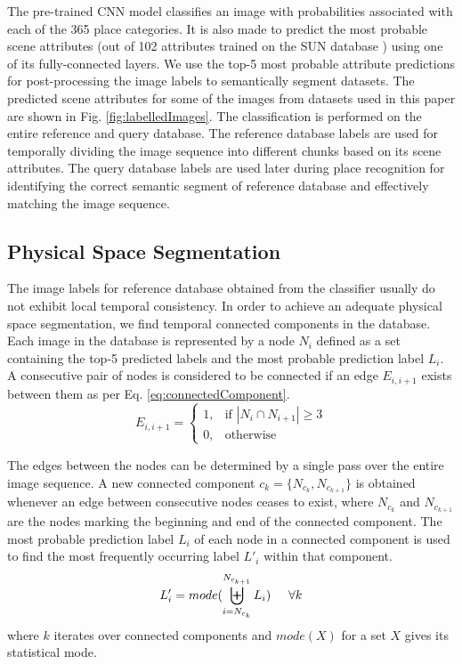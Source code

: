 \documentclass[letterpaper, 10 pt, conference]{ieeeconf}  %
\begin{document}
The pre-trained CNN model classifies an image with probabilities associated with each of the 365 place categories. It is also made to predict the most probable scene attributes (out of 102 attributes trained on the SUN database \cite{Patterson2012SunAttributes}) using one of its fully-connected layers. We use the top-5 most probable attribute predictions for post-processing the image labels to semantically segment datasets. The predicted scene attributes for some of the images from datasets used in this paper are shown in Fig. \ref{fig:labelledImages}. The classification is performed on the entire reference and query database. The reference database labels are used for temporally dividing the image sequence into different chunks based on its scene attributes. The query database labels are used later during place recognition for identifying the correct semantic segment of reference database and effectively matching the image sequence.

\subsection{Physical Space Segmentation}
The image labels for reference database obtained from the classifier usually do not exhibit local temporal consistency. In order to achieve an adequate physical space segmentation, we find temporal connected components in the database. Each image in the database is represented by a node $N_i$ defined as a set containing the top-5 predicted labels and the most probable prediction label $L_i$. A consecutive pair of nodes is considered to be connected if an edge $E_{i,i+1}$ exists between them as per Eq. \ref{eq:connectedComponent}.
\begin{equation}
 E_{i,i+1} = 
 \begin{cases}
  1, & \text{if } \left\vert{N_i \cap N_{i+1}}\right\vert \geq 3\\
  0, & \text{otherwise}
 \end{cases}
 \label{eq:connectedComponent}
\end{equation}

The edges between the nodes can be determined by a single pass over the entire image sequence. A new connected component $c_k = \{N_{c_k},N_{c_{k+1}}\}$ is obtained whenever an edge between consecutive nodes ceases to exist, where $N_{c_k}$ and $N_{c_{k+1}}$ are the nodes marking the beginning and end of the connected component. The most probable prediction label $L_i$ of each node in a connected component is used to find the most frequently occurring label $L'_i$ within that component. 
\begin{equation}
 L'_i = mode(\biguplus\limits_{i=N_{c_k}}^{N_{c_{k+1}}} L_i) \hspace{0.5cm} \forall k
  \label{eq:labelsModeCC}
\end{equation}
where $k$ iterates over connected components and $mode(X)$ for a set $X$ gives its statistical mode.
\end{document}
